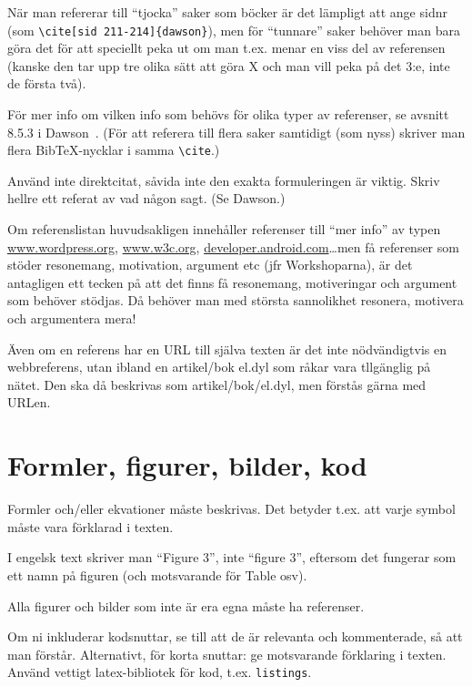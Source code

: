 \documentclass[swedish, a4paper,12pt]{article}
\begin{document}
När man refererar till ``tjocka'' saker som böcker är det lämpligt att ange sidnr
(som \verb|\cite[sid 211-214]{dawson}|), men för ``tunnare'' saker behöver man bara göra det för att speciellt peka ut om man t.ex. menar en viss del av referensen (kanske den tar upp tre olika sätt att göra X och man vill peka på det 3:e, inte de första två).

För mer info om vilken info som behövs för olika typer av referenser, se avsnitt 8.5.3 i Dawson~\cite{dawson:projects-in-computing,dawson:projects-in-computing-old}. (För att referera till flera saker samtidigt (som nyss) skriver man flera BibTeX-nycklar i samma \verb|\cite|.)

Använd inte direktcitat, såvida inte den exakta formuleringen är viktig.  Skriv hellre ett referat av vad någon sagt. (Se Dawson.)

Om referenslistan huvudsakligen innehåller referenser till ``mer info'' av typen
\url{www.wordpress.org}, \url{www.w3c.org}, \url{developer.android.com}\ldots men få referenser som stöder resonemang, motivation, argument etc (jfr Workshoparna), är det antagligen ett tecken på att det finns få resonemang, motiveringar och argument som behöver stödjas. Då behöver man med största sannolikhet resonera, motivera och argumentera mera!

Även om en referens har en URL till själva texten är det inte nödvändigtvis en webbreferens, utan ibland en artikel/bok el.dyl som råkar vara tllgänglig på nätet. Den ska då beskrivas som artikel/bok/el.dyl, men förstås gärna med URLen.

\section{Formler, figurer, bilder, kod}
\label{sec:forml-figur-bild}

Formler och/eller ekvationer måste beskrivas.  Det betyder t.ex. att varje symbol måste vara förklarad i texten.

I engelsk text skriver man ``Figure 3'', inte ``figure 3'', eftersom det fungerar som ett namn på figuren (och motsvarande för Table osv).

Alla figurer och bilder som inte är era egna måste ha referenser.

Om ni inkluderar kodsnuttar, se till att de är relevanta och kommenterade, så att man förstår.  Alternativt, för korta snuttar: ge motsvarande förklaring i texten.
Använd vettigt latex-bibliotek för kod, t.ex. \texttt{listings}.
\end{document}
